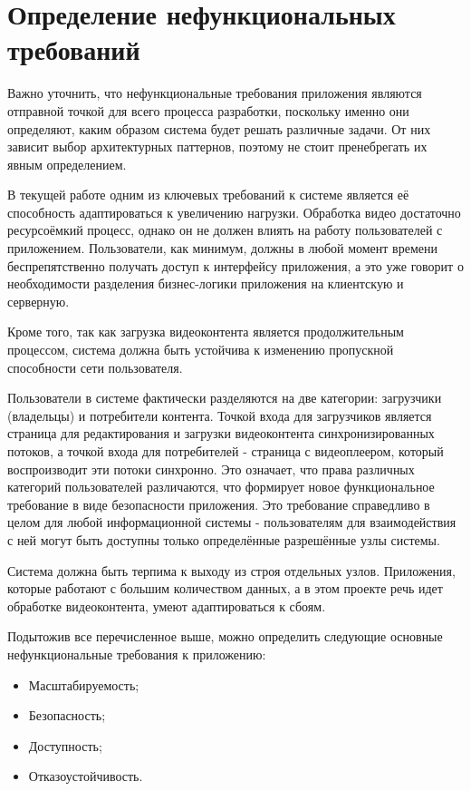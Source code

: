 \section{Определение нефункциональных требований} \label{ch2:system_requirements}

	Важно уточнить, что нефункциональные требования приложения являются отправной точкой для всего процесса разработки, поскольку именно они определяют, каким образом система будет решать различные задачи. От них зависит выбор архитектурных паттернов, поэтому не стоит пренебрегать их явным определением.
	
	В текущей работе одним из ключевых требований к системе является её способность адаптироваться к увеличению нагрузки. Обработка видео достаточно ресурсоёмкий процесс, однако он не должен влиять на работу пользователей с приложением. Пользователи, как минимум, должны в любой момент времени беспрепятственно получать доступ к интерфейсу приложения, а это уже говорит о необходимости разделения бизнес-логики приложения на клиентскую и серверную.
	
	Кроме того, так как загрузка видеоконтента является продолжительным процессом, система должна быть устойчива к изменению пропускной способности сети пользователя.
	
	Пользователи в системе фактически разделяются на две категории: загрузчики (владельцы) и потребители контента. Точкой входа для загрузчиков является страница для редактирования и загрузки видеоконтента синхронизированных потоков, а точкой входа для потребителей - страница с видеоплеером, который воспроизводит эти потоки синхронно. Это означает, что права различных категорий пользователей различаются, что формирует новое функциональное требование в виде безопасности приложения. Это требование справедливо в целом для любой информационной системы - пользователям для взаимодействия с ней могут быть доступны только определённые разрешённые узлы системы.
	
	Система должна быть терпима к выходу из строя отдельных узлов. Приложения, которые работают с большим количеством данных, а в этом проекте речь идет обработке видеоконтента, умеют адаптироваться к сбоям.
	
	Подытожив все перечисленное выше, можно определить следующие основные нефункциональные требования к приложению:
	\begin{itemize}[label=$\bullet$]
		\item Масштабируемость;
		\item Безопасность;
		\item Доступность;
		\item Отказоустойчивость.
	\end{itemize}

